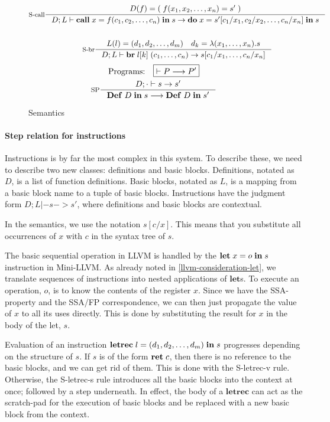 \documentclass[a4paper, oneside, 10pt, final]{memoir}
\begin{document}
\begin{figure}
\begin{gather*}
    \inference[S-call]{D(f) = (\;f(x_1, x_2, \dotsc, x_n) = s'\;)}{D;L |-
      \icall{x}{f}{(c_1, c_2, \dotsc, c_n)}{s} -> \ido{x}{s'[c_1/x_1, c_2/x_2,
        \dotsc, c_n/x_n]}{s}}\\\\
    \inference[S-br]{L(l) = \dbundle \quad d_k = \lambda(x_1, \dotsc,
      x_n).s}{D;L |- \ibr{\lbl{k}}{(c_1, \dotsc, c_n)} -> s[c_1/x_1, \dotsc, c_n/x_n]}
 \end{gather*}
 \begin{gather*}
   \text{Programs:} \quad \boxed{|- P --> P'}\\
   \inference[SP]{D;\cdot |- s -> s'}{\ipgm{D}{s} --> \ipgm{D}{s'}}
 \end{gather*}
  \caption{Semantics}
  \label{fig:semantics}
\end{figure}

\paragraph{Step relation for instructions}

Instructions is by far the most complex in this system. To describe
these, we need to describe two new classes: definitions and basic
blocks. Definitions, notated as $D$, is a list of function
definitions. Basic blocks, notated as $L$, is a mapping from a basic
block name to a tuple of basic blocks. Instructions have the
judgment form $\boxed{D;L |- s -> s'}$, where definitions and basic
blocks are contextual.

In the semantics, we use the notation $s[c/x]$. This means that you
substitute all occurrences of $x$ with $c$ in the syntax tree of
$s$.

The basic sequential operation in LLVM is handled by the
$\mathbf{let} \; x = o \; \mathbf{in} \; s$ instruction in Mini-LLVM. As already noted in
\ref{llvm-consideration-let}, we translate sequences of instructions
into nested applications of $\mathbf{let}$s. To execute an operation,
$o$, is to know the contents of the register $x$. Since we have the
SSA-property and the SSA/FP correspondence, we can then just propagate
the value of $x$ to all its uses directly. This is done by
substituting the result for $x$ in the body of the let, $s$.

Evaluation of an instruction $\mathbf{letrec} \; l = (d_1, d_2, \dotsc, d_m) \; \mathbf{in} \; s$ progresses
depending on the structure of $s$. If $s$ is of the form $\mathbf{ret} \; c$,
then there is no reference to the basic blocks, and we can get rid of
them. This is done with the S-letrec-v rule. Otherwise, the S-letrec-s
rule introduces all the basic blocks into the context at once;
followed by a step underneath.  In effect, the body of a
$\mathbf{letrec}$ can act as the scratch-pad for the execution of
basic blocks and be replaced with a new basic block from the context.
\end{document}
